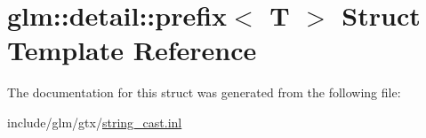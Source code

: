\hypertarget{structglm_1_1detail_1_1prefix}{}\section{glm\+:\+:detail\+:\+:prefix$<$ T $>$ Struct Template Reference}
\label{structglm_1_1detail_1_1prefix}


The documentation for this struct was generated from the following file\+:\begin{DoxyCompactItemize}
\item 
include/glm/gtx/\hyperlink{string__cast_8inl}{string\+\_\+cast.\+inl}\end{DoxyCompactItemize}
